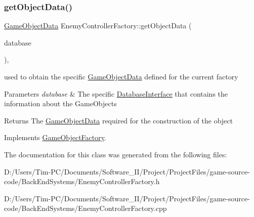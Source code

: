 \subsubsection{\texorpdfstring{get\+Object\+Data()}{getObjectData()}}
{\footnotesize\ttfamily \hyperlink{struct_game_object_data}{Game\+Object\+Data} Enemy\+Controller\+Factory\+::get\+Object\+Data (\begin{DoxyParamCaption}\item[{const std\+::shared\+\_\+ptr$<$ \hyperlink{class_database_interface}{Database\+Interface} $>$ \&}]{database }\end{DoxyParamCaption})\hspace{0.3cm}{\ttfamily [override]}, {\ttfamily [virtual]}}



used to obtain the specific \hyperlink{struct_game_object_data}{Game\+Object\+Data} defined for the current factory 


\begin{DoxyParams}{Parameters}
{\em database} & The specific \hyperlink{class_database_interface}{Database\+Interface} that contains the information about the Game\+Objects \\
\hline
\end{DoxyParams}
\begin{DoxyReturn}{Returns}
The \hyperlink{struct_game_object_data}{Game\+Object\+Data} required for the construction of the object 
\end{DoxyReturn}


Implements \hyperlink{class_game_object_factory_ae9358fbb3ef2d3b127320341760d3ff9}{Game\+Object\+Factory}.



The documentation for this class was generated from the following files\+:\begin{DoxyCompactItemize}
\item 
D\+:/\+Users/\+Tim-\/\+P\+C/\+Documents/\+Software\+\_\+\+I\+I/\+Project/\+Project\+Files/game-\/source-\/code/\+Back\+End\+Systems/Enemy\+Controller\+Factory.\+h\item 
D\+:/\+Users/\+Tim-\/\+P\+C/\+Documents/\+Software\+\_\+\+I\+I/\+Project/\+Project\+Files/game-\/source-\/code/\+Back\+End\+Systems/Enemy\+Controller\+Factory.\+cpp\end{DoxyCompactItemize}
